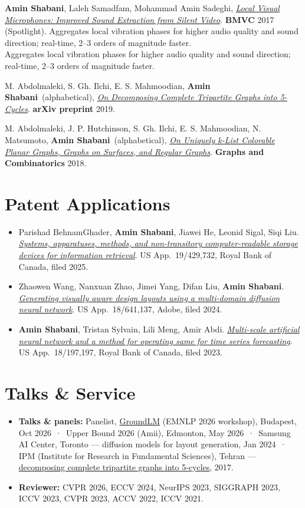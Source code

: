 \documentclass[10pt,letterpaper]{article}
\newcommand{\venue}[1]{{\ttfamily\footnotesize\color{accent}#1}}
\newcommand{\me}{\textbf{Amin Shabani}}
\newcommand{\soft}[1]{{\color{inksoft}#1}}
\newcommand{\pub}[6]{%
  \item #1, \href{#3}{\emph{#2}}. \venue{\textbf{#4} #5}.%
  \ifx\relax#6\relax\else\\ \soft{\small #6}\fi}
\begin{document}
\begin{pubs}
\pub{\me, Laleh Samadfam, Mohammad Amin Sadeghi}{Local Visual Microphones: Improved Sound Extraction from Silent Video}{https://arxiv.org/abs/1801.09436}{BMVC}{2017 (Spotlight)}{Aggregates local vibration phases for higher audio quality and sound direction; real-time, 2--3 orders of magnitude faster.}
\pub{M. Abdolmaleki, S. Gh. Ilchi, E. S. Mahmoodian, \me\ (alphabetical)}{On Decomposing Complete Tripartite Graphs into 5-Cycles}{https://arxiv.org/abs/1907.06187}{arXiv preprint}{2019}{}
\pub{M. Abdolmaleki, J. P. Hutchinson, S. Gh. Ilchi, E. S. Mahmoodian, N. Matsumoto, \me\ (alphabetical)}{On Uniquely k-List Colorable Planar Graphs, Graphs on Surfaces, and Regular Graphs}{https://link.springer.com/article/10.1007/s00373-018-1879-7}{Graphs and Combinatorics}{2018}{}
\end{pubs}

\section{Patent Applications}
\begin{itemize}
  \item Parishad BehnamGhader, \me, Jiawei He, Leonid Sigal, Siqi Liu. \href{https://patents.google.com/patent/US20260195323A1}{\emph{Systems, apparatuses, methods, and non-transitory computer-readable storage devices for information retrieval}}. \venue{US App.\ 19/429,732}, Royal Bank of Canada, filed 2025.
  \item Zhaowen Wang, Nanxuan Zhao, Jimei Yang, Difan Liu, \me. \href{https://patents.google.com/patent/US20250329081A1}{\emph{Generating visually aware design layouts using a multi-domain diffusion neural network}}. \venue{US App.\ 18/641,137}, Adobe, filed 2024.
  \item \me, Tristan Sylvain, Lili Meng, Amir Abdi. \href{https://patents.google.com/patent/US20230368002A1}{\emph{Multi-scale artificial neural network and a method for operating same for time series forecasting}}. \venue{US App.\ 18/197,197}, Royal Bank of Canada, filed 2023.
\end{itemize}

\section{Talks \& Service}
\begin{itemize}
  \item \textbf{Talks \& panels:} Panelist, \href{https://groundlm.github.io/grouplm_emnlp2026/}{GroundLM} (EMNLP 2026 workshop), Budapest, Oct 2026 \,·\, Upper Bound 2026 (Amii), Edmonton, May 2026 \,·\, Samsung AI Center, Toronto — diffusion models for layout generation, Jan 2024 \,·\, IPM (Institute for Research in Fundamental Sciences), Tehran — \href{https://arxiv.org/abs/1907.06187}{decomposing complete tripartite graphs into 5-cycles}, 2017.
  \item \textbf{Reviewer:} CVPR 2026, ECCV 2024, NeurIPS 2023, SIGGRAPH 2023, ICCV 2023, CVPR 2023, ACCV 2022, ICCV 2021.
\end{itemize}
\end{document}
